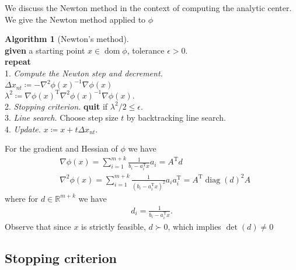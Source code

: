 \documentclass[11pt]{amsart}
\theoremstyle{definition}
\newtheorem{algorithm}{Algorithm}[section]
\theoremstyle{remark}
\newcommand{\ind}{\hspace*{0.5cm}}
\newcommand{\transpose}{\text{T}}
\DeclareMathOperator{\domain}{dom}
\DeclareMathOperator{\diag}{diag}
\begin{document}
        We discuss the Newton method in the context of computing the analytic center. We give the Newton method applied to $\phi$
        \begin{algorithm}[Newton's method]
        \label{a:basic_conceptual_cp_alg}\mbox{}\\
            \ind \textbf{given} a starting point $x \in \domain \phi$, tolerance $\epsilon > 0.$ \\
            \ind \textbf{repeat} \\
            \ind\ind 1. \emph{Compute the Newton step and decrement.} \\
            \ind\ind\ind $\Delta x_{nt} \coloneqq -\nabla^2 \phi(x)^{-1} \nabla \phi(x)$ \\
            \ind\ind\ind $\lambda^2 \coloneqq \nabla \phi(x)^\transpose \nabla^2 \phi(x)^{-1} \nabla \phi(x).$ \\
            \ind\ind 2. \emph{Stopping criterion.} \textbf{quit} if $\lambda^2/2 \leq \epsilon.$\\
            \ind\ind 3. \emph{Line search.} Choose step size $t$ by backtracking line search. \\
            \ind\ind 4. \emph{Update.} $x \coloneqq x + t\Delta x_{nt}.$ \\
        \end{algorithm} 
        For the gradient and Hessian of $\phi$ we have
        \begin{align}
            &\nabla \phi(x) = \sum_{i=1}^{m+k} \frac{1}{b_i - a_i^\transpose x}a_i = A^\transpose d \\
            &\nabla^2 \phi(x) = \sum_{i=1}^{m+k} \frac{1}{(b_i - a_i^\transpose x)^2}a_i a_i^\transpose = A^\transpose \diag(d)^2 A
        \end{align}
        where for $d \in \mathbb{R}^{m+k}$ we have
        \begin{align*}
            d_i = \frac{1}{b_i - a_i^\transpose x}.
        \end{align*}
        Observe that since $x$ is strictly feasible, $d \succ 0$, which implies $\det(d) \neq 0$ 

    \subsection{Stopping criterion}
\end{document}

